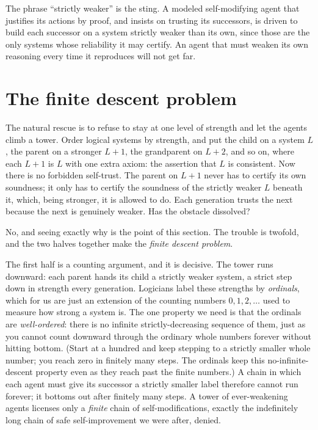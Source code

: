 \documentclass[10pt]{article}
\theoremstyle{definition}
\theoremstyle{remark}
\begin{document}
The phrase ``strictly weaker'' is the sting. A modeled self-modifying agent that justifies its actions by proof, and insists on trusting its successors, is driven to build each successor on a system strictly weaker than its own, since those are the only systems whose reliability it may certify. An agent that must weaken its own reasoning every time it reproduces will not get far.

\section{The finite descent problem}
\label{sec:descent}

The natural rescue is to refuse to stay at one level of strength and let the agents climb a tower. Order logical systems by strength, and put the child on a system $L$, the parent on a stronger $L{+}1$, the grandparent on $L{+}2$, and so on, where each $L{+}1$ is $L$ with one extra axiom: the assertion that $L$ is consistent. Now there is no forbidden self-trust. The parent on $L{+}1$ never has to certify its own soundness; it only has to certify the soundness of the strictly weaker $L$ beneath it, which, being stronger, it is allowed to do. Each generation trusts the next because the next is genuinely weaker. Has the obstacle dissolved?

No, and seeing exactly why is the point of this section. The trouble is twofold, and the two halves together make the \emph{finite descent problem}.

The first half is a counting argument, and it is decisive. The tower runs downward: each parent hands its child a strictly weaker system, a strict step down in strength every generation. Logicians label these strengths by \emph{ordinals}, which for us are just an extension of the counting numbers $0, 1, 2, \dots$ used to measure how strong a system is. The one property we need is that the ordinals are \emph{well-ordered}: there is no infinite strictly-decreasing sequence of them, just as you cannot count downward through the ordinary whole numbers forever without hitting bottom. (Start at a hundred and keep stepping to a strictly smaller whole number; you reach zero in finitely many steps. The ordinals keep this no-infinite-descent property even as they reach past the finite numbers.) A chain in which each agent must give its successor a strictly smaller label therefore cannot run forever; it bottoms out after finitely many steps. A tower of ever-weakening agents licenses only a \emph{finite} chain of self-modifications, exactly the indefinitely long chain of safe self-improvement we were after, denied.
\end{document}
